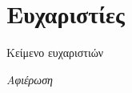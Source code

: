 \chapter*{Ευχαριστίες}

\pagestyle{plain}

Κείμενο ευχαριστιών

\null\vfill
\begin{flushright}
    \textit{Αφιέρωση}
\end{flushright}